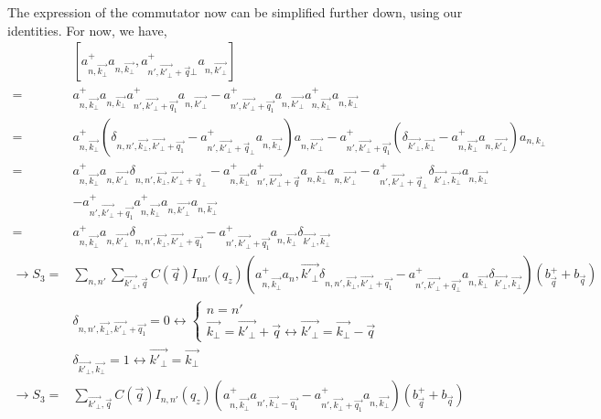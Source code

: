 \documentclass{article}
\begin{document}
The expression of the commutator now can be simplified further down, using our identities. For now, we have, 
\begin{align*}
    & \left[a^+_{n, \vec{k_\bot}}a_{n, \vec{k_\bot}},a^+_{{n'}, \vec{k'_\bot}+ \vec{q}\bot} a_{n, \vec{k'_\bot}}\right] \\
    = & a^+_{n, \vec{k_\bot}} a_{n, \vec{k_\bot}} a^+_{{n'}, \vec{k'_\bot}+\vec{q_1}} a_{n, \vec{k'_\bot}} - a^+_{{n'}, \vec{k'_\bot}+ \vec{q_1}} a_{n, \vec{k'_\bot}} a^+_{n, \vec{k_\bot}} a_{n, \vec{k_\bot}}\\
    = &a^+_{n, \vec{k_\bot}} \left(\delta_{n,n',\vec{k_\bot},\vec{k'_\bot}+\vec{q_1}}-a^+_{{n'}, \vec{k'_\bot}+ \vec{q}_\bot}a_{n,\vec{k_\bot}}\right)a_{n, \vec{k'_\bot}}-a^+_{n', \vec{k'_\bot}+ \vec{q_1}}\left(\delta_{\vec{k'_\bot}, \vec{k_\bot}}-a^+_{n,\vec{k_\bot}}a_{n,\vec{k'_\bot}}\right)a_{n,k_\bot} \\
    = & a^+_{n, \vec{k_\bot}} a_{n, \vec{k'_\bot}}\delta_{n,n', \vec{k_\bot}, \vec{k'_\bot} + \vec{q}_\bot}- a^+_{n, \vec{k_\bot}} a^+_{n', \vec{k'_\bot} + \vec{q}} a_{n, \vec{k_\bot}} a_{n, \vec{k'_\bot}} - a^+_{n', \vec{k'_\bot} + \vec{q}_\bot} \delta_{ \vec{k'_\bot}, \vec{k_\bot}} a_{n,\vec{k_\bot}} \\
    &  - a^+_{n', \vec{k'_\bot} + \vec{q_1}} a^+_{n, \vec{k_\bot}}a_{n, \vec{k'_\bot}}a_{n, \vec{k_\bot}}\\
    = & a^+_{n, \vec{k_\bot}}a_{n, \vec{k'_\bot}} \delta_{n,n', \vec{k_\bot}, \vec{k'_\bot} + \vec{q_1}} - a^+_{n', \vec{k'_\bot} + \vec{q_1}} a_{n, \vec{k_\bot}}\delta_{\vec{k'_\bot}, \vec{k_\bot}}\\   
    \rightarrow S_3 =& \sum_{n,n'} \sum_{\vec{k'_\bot},\vec{q}} C\left(\vec{q}\right) I_{nn'} \left(q_z\right) \left(a^+_{n, \vec{k_\bot}}a_n, \vec{k'_\bot} \delta_{n,n', \vec{k_\bot}, \vec{k'_\bot} + \vec{q_1}} - a^+_{n', \vec{k'_\bot} + \vec{q_\bot }} a_{n, \vec{k_\bot}}\delta_{\vec{k'_\bot}, \vec{k_\bot}}\right)\left(b^+_{\vec{q}}+ b_{\vec{q}}\right)\\
    & \delta_{n,n', \vec{k_\bot},\vec{k'_\bot}+\vec{q_1}}=0 \leftrightarrow \begin{cases}
        n = n'\\
        \vec{k_\bot} = \vec{k'_\bot} + \vec{q} \leftrightarrow \vec{k'_\bot} = \vec{k_\bot} - \vec{q}
    \end{cases} \\
    & \delta_{\vec{k'_\bot}, \vec{k_\bot}} = 1 \leftrightarrow \vec{k'_\bot} = \vec{k_\bot} \\
    \rightarrow S_3 = & \sum_{\vec{k'_\bot},\vec{q}}C\left(\vec{q}\right) I_{n,n'} \left(q_z\right) \left(a^+_{n,\vec{k_\bot}}a_{n', \vec{k_\bot} -\vec{q_1}} - a^+_{n', \vec{k_\bot}+ \vec{q_1}}a_{n, \vec{k_\bot}}\right)\left(b^+_{\vec{q}}+ b_{\vec{q}}\right) \\

\end{align*}
\end{document}
